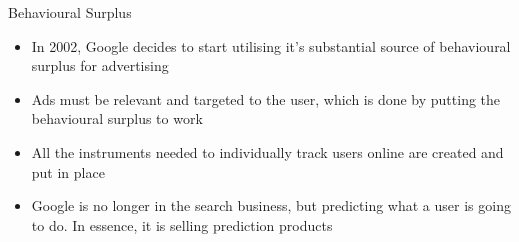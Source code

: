 \documentclass[aspectratio=169]{beamer}
\begin{document}
    {%
    \begin{frame}{Behavioural Surplus}
        \begin{itemize}
            \item In 2002, Google decides to start utilising it's substantial
                source of behavioural surplus for \alert{advertising}
            \item Ads must be relevant and targeted to the user, which is done
                by putting the behavioural surplus to work
            \pause{}
            \item All the instruments needed to individually track users online
                are created and put in place
            \item Google is no longer in the search business, but predicting
                what a user is going to do. In essence, it is selling
                \alert{prediction products}
        \end{itemize}
    \end{frame}
    }
\end{document}
